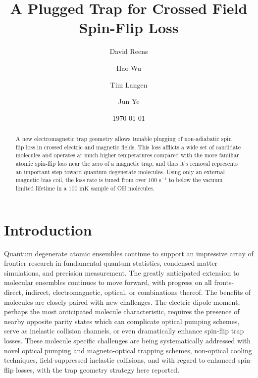 \documentclass[%
 reprint,
 amsmath,amssymb,
 aps,
prl,
]{revtex4-1}
\begin{document}

\title{A Plugged Trap for Crossed Field Spin-Flip Loss}%


\author{David Reens}%
\author{Hao Wu}
\author{Tim Langen}%
\author{Jun Ye}
%

\date{\today}%


\begin{abstract}
A new electromagnetic trap geometry allows tunable plugging of non-adiabatic spin flip loss in crossed electric and magnetic fields. This loss afflicts a wide set of candidate molecules and operates at much higher temperatures compared with the more familiar atomic spin-flip loss near the zero of a magnetic trap, and thus it's removal represents an important step toward quantum degenerate molecules. Using only an external magnetic bias coil, the loss rate is tuned from over $100 \text{ s}^{-1} $ to below the vacuum limited lifetime in a $100 \text{ mK}$ sample of OH molecules.
\end{abstract}


\maketitle


%
%
\section{Introduction}
Quantum degenerate atomic ensembles continue to support an impressive array of frontier research in fundamental quantum statistics, condensed matter simulations, and precision measurement. The greatly anticipated extension to molecular ensembles continues to move forward, with progress on all fronts- direct, indirect, electromagnetic, optical, or combinations thereof. The benefits of molecules are closely paired with new challenges. The electric dipole moment, perhaps the most anticipated molecule characteristic, requires the presence of nearby opposite parity states which can complicate optical pumping schemes, serve as inelastic collision channels, or even dramatically enhance spin-flip trap losses. These molecule specific challenges are being systematically addressed with novel optical pumping and magneto-optical trapping schemes, non-optical cooling techniques, field-suppressed inelastic collisions, and with regard to enhanced spin-flip losses, with the trap geometry strategy here reported. 
\end{document}
